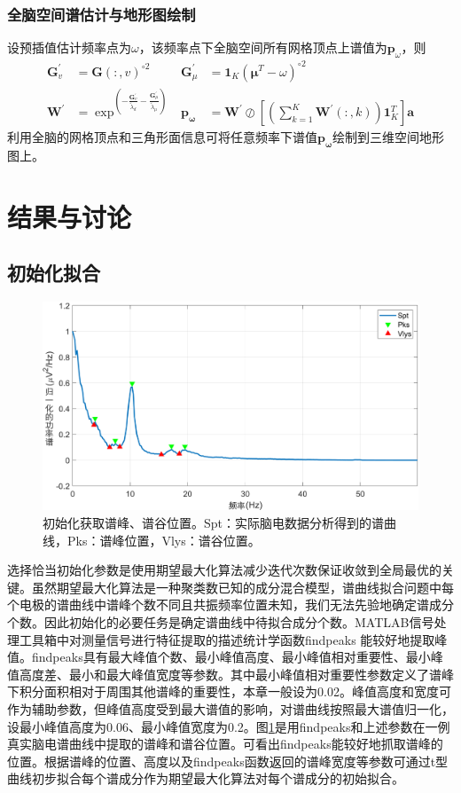 \subsubsection{全脑空间谱估计与地形图绘制}
设预插值估计频率点为$\omega$，该频率点下全脑空间所有网格顶点上谱值为$\mathbf{p}_\omega$，则
\begin{equation}\label{eq7.16}
\begin{aligned}
\mathbf{G}^\prime_v& = \mathbf{G}(:,v)^{\circ2}&
\mathbf{G}^\prime_\mu& = \mathbf{1}_K(\mathbf{\mu}^T-\omega)^{\circ2}\\
\mathbf{W}^\prime& =\exp^{(-\frac{\mathbf{G}^\prime_v}{\tilde{\lambda}_d}-\frac{\mathbf{G}^\prime_\mu}{\tilde{\lambda}_\mu})}&
\mathbf{p_\omega}& =\mathbf{W}^\prime\oslash[(\sum_{k=1}^K\mathbf{W}^\prime(:,k))\mathbf{1}_K^T]\mathbf{a}
\end{aligned}
\end{equation}
利用全脑的网格顶点和三角形面信息可将任意频率下谱值$\mathbf{p_\omega}$绘制到三维空间地形图上。

\section{结果与讨论}
\subsection{初始化拟合}
\begin{figure}[!h]
	\includegraphics[width=15cm]{pic/xipi/detect.png}
	\caption{初始化获取谱峰、谱谷位置。Spt：实际脑电数据分析得到的谱曲线，Pks：谱峰位置，Vlys：谱谷位置。}
	\label{7:detect}
\end{figure}
选择恰当初始化参数是使用期望最大化算法减少迭代次数保证收敛到全局最优的关键。虽然期望最大化算法是一种聚类数已知的成分混合模型，谱曲线拟合问题中每个电极的谱曲线中谱峰个数不同且共振频率位置未知，我们无法先验地确定谱成分个数。因此初始化的必要任务是确定谱曲线中待拟合成分个数。MATLAB信号处理工具箱中对测量信号进行特征提取的描述统计学函数findpeaks
能较好地提取峰值。findpeaks具有最大峰值个数、最小峰值高度、最小峰值相对重要性、最小峰值高度差、最小和最大峰值宽度等参数。其中最小峰值相对重要性参数定义了谱峰下积分面积相对于周围其他谱峰的重要性，本章一般设为0.02。峰值高度和宽度可作为辅助参数，但峰值高度受到最大谱值的影响，对谱曲线按照最大谱值归一化，设最小峰值高度为0.06、最小峰值宽度为0.2。图\ref{7:detect}是用findpeaks和上述参数在一例真实脑电谱曲线中提取的谱峰和谱谷位置。可看出findpeaks能较好地抓取谱峰的位置。根据谱峰的位置、高度以及findpeaks函数返回的谱峰宽度等参数可通过t型曲线初步拟合每个谱成分作为期望最大化算法对每个谱成分的初始拟合。

